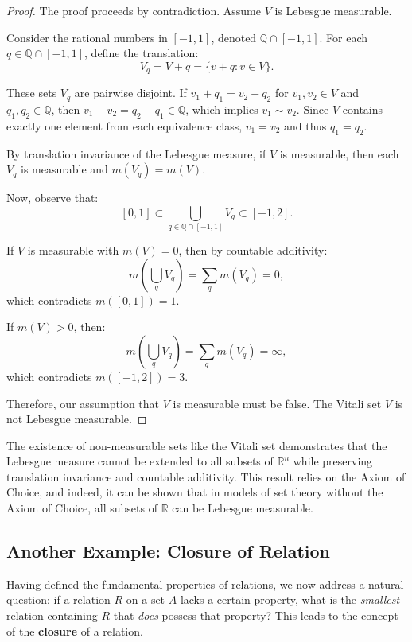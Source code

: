 \begin{proof}
The proof proceeds by contradiction. Assume \( V \) is Lebesgue measurable.

Consider the rational numbers in \([-1,1]\), denoted \(\mathbb{Q} \cap [-1,1]\). For each \( q \in \mathbb{Q} \cap [-1,1] \), define the translation:
\[
V_q = V + q = \{ v + q : v \in V \}.
\]

These sets \( V_q \) are pairwise disjoint. If \( v_1 + q_1 = v_2 + q_2 \) for \( v_1, v_2 \in V \) and \( q_1, q_2 \in \mathbb{Q} \), then \( v_1 - v_2 = q_2 - q_1 \in \mathbb{Q} \), which implies \( v_1 \sim v_2 \). Since \( V \) contains exactly one element from each equivalence class, \( v_1 = v_2 \) and thus \( q_1 = q_2 \).

By translation invariance of the Lebesgue measure, if \( V \) is measurable, then each \( V_q \) is measurable and \( m(V_q) = m(V) \).

Now, observe that:
\[
[0,1] \subset \bigcup_{q \in \mathbb{Q} \cap [-1,1]} V_q \subset [-1,2].
\]

If \( V \) is measurable with \( m(V) = 0 \), then by countable additivity:
\[
m\left( \bigcup_{q} V_q \right) = \sum_{q} m(V_q) = 0,
\]
which contradicts \( m([0,1]) = 1 \).

If \( m(V) > 0 \), then:
\[
m\left( \bigcup_{q} V_q \right) = \sum_{q} m(V_q) = \infty,
\]
which contradicts \( m([-1,2]) = 3 \).

Therefore, our assumption that \( V \) is measurable must be false. The Vitali set \( V \) is not Lebesgue measurable.
\end{proof}


\begin{remark}
The existence of non-measurable sets like the Vitali set demonstrates that the Lebesgue measure cannot be extended to all subsets of \(\mathbb{R}^n\) while preserving translation invariance and countable additivity. This result relies on the Axiom of Choice, and indeed, it can be shown that in models of set theory without the Axiom of Choice, all subsets of \(\mathbb{R}\) can be Lebesgue measurable.
\end{remark}

\subsection{Another Example: Closure of Relation}
Having defined the fundamental properties of relations, we now address a natural question: if a relation $R$ on a set $A$ lacks a certain property, what is the \emph{smallest} relation containing $R$ that \emph{does} possess that property? This leads to the concept of the \textbf{closure} of a relation.


